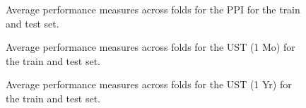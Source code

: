 \documentclass{article}
\theoremstyle{plain}
\theoremstyle{definition}
\theoremstyle{remark}
\begin{document}

\begin{figure}


\caption{\label{fig-ppi}Average performance measures across folds for the PPI for the train and test set.}

\end{figure}%


\begin{figure}


\caption{\label{fig-ust-1}Average performance measures across folds for the UST (1 Mo) for the train and test set.}

\end{figure}%


\begin{figure}


\caption{\label{fig-ust-1y}Average performance measures across folds for the UST (1 Yr) for the train and test set.}

\end{figure}%
\end{document}
